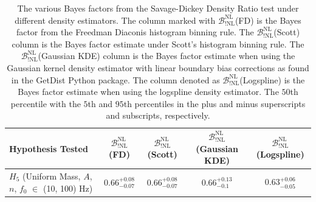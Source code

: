 \begin{table}
\centering
\begin{tabularx}{1.0\textwidth}{l| c |c |c| c}
\hline\hline
 Hypothesis Tested  & $\mathcal{B}^{\mathrm{NL}}_{\mathrm{!NL}}$(FD)  & $\mathcal{B}^{\mathrm{NL}}_{\mathrm{!NL}}$(Scott) & $\mathcal{B}^{\mathrm{NL}}_{\mathrm{!NL}}$(Gaussian KDE) & $\mathcal{B}^{\mathrm{NL}}_{\mathrm{!NL}}$(Logspline)\\
\hline\hline
$H_5$ (Uniform Mass, $A$, $n$, $f_0$ $\in$ (10, 100) Hz) &
$0.66^{+0.08}_{-0.07}$ & $0.66^{+0.08}_{-0.07}$ & $0.66^{+0.13}_{-0.1}$ & $0.63^{+0.06}_{-0.05}$ \\
\hline\hline
\end{tabularx}
\caption{The various Bayes factors from the Savage-Dickey Density Ratio test under different density estimators. The column marked with $\mathcal{B}^{\mathrm{NL}}_{\mathrm{!NL}}$(FD) is the Bayes factor from the Freedman Diaconis histogram binning rule. The $\mathcal{B}^{\mathrm{NL}}_{\mathrm{!NL}}$(Scott) column is the Bayes factor estimate under Scott's histogram binning rule. The $\mathcal{B}^{\mathrm{NL}}_{\mathrm{!NL}}$(Gaussian KDE) column is the Bayes factor estimate when using the Gaussian kernel density estimator with linear boundary bias corrections as found in the GetDist Python package. The column denoted as  $\mathcal{B}^{\mathrm{NL}}_{\mathrm{!NL}}$(Logspline) is the Bayes factor estimate when using the logspline density estimator. The $50$th percentile with the $5$th and $95$th percentiles in the plus and minus superscripts and subscripts, respectively.}\label{table:Bayes_sddr}
\end{table}
